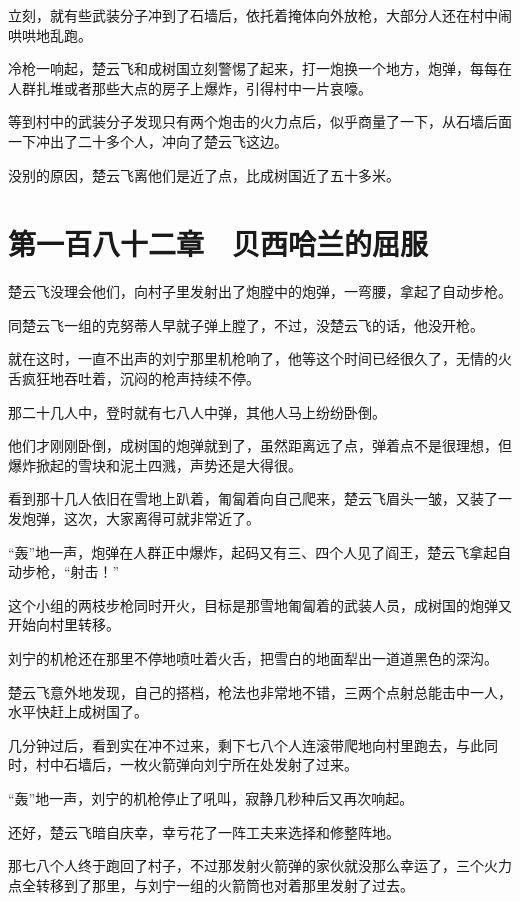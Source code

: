 立刻，就有些武装分子冲到了石墙后，依托着掩体向外放枪，大部分人还在村中闹哄哄地乱跑。

冷枪一响起，楚云飞和成树国立刻警惕了起来，打一炮换一个地方，炮弹，每每在人群扎堆或者那些大点的房子上爆炸，引得村中一片哀嚎。

等到村中的武装分子发现只有两个炮击的火力点后，似乎商量了一下，从石墙后面一下冲出了二十多个人，冲向了楚云飞这边。

没别的原因，楚云飞离他们是近了点，比成树国近了五十多米。

\section{第一百八十二章　贝西哈兰的屈服}

楚云飞没理会他们，向村子里发射出了炮膛中的炮弹，一弯腰，拿起了自动步枪。

同楚云飞一组的克努蒂人早就子弹上膛了，不过，没楚云飞的话，他没开枪。

就在这时，一直不出声的刘宁那里机枪响了，他等这个时间已经很久了，无情的火舌疯狂地吞吐着，沉闷的枪声持续不停。

那二十几人中，登时就有七八人中弹，其他人马上纷纷卧倒。

他们才刚刚卧倒，成树国的炮弹就到了，虽然距离远了点，弹着点不是很理想，但爆炸掀起的雪块和泥土四溅，声势还是大得很。

看到那十几人依旧在雪地上趴着，匍匐着向自己爬来，楚云飞眉头一皱，又装了一发炮弹，这次，大家离得可就非常近了。

“轰”地一声，炮弹在人群正中爆炸，起码又有三、四个人见了阎王，楚云飞拿起自动步枪，“射击！”

这个小组的两枝步枪同时开火，目标是那雪地匍匐着的武装人员，成树国的炮弹又开始向村里转移。

刘宁的机枪还在那里不停地喷吐着火舌，把雪白的地面犁出一道道黑色的深沟。

楚云飞意外地发现，自己的搭档，枪法也非常地不错，三两个点射总能击中一人，水平快赶上成树国了。

几分钟过后，看到实在冲不过来，剩下七八个人连滚带爬地向村里跑去，与此同时，村中石墙后，一枚火箭弹向刘宁所在处发射了过来。

“轰”地一声，刘宁的机枪停止了吼叫，寂静几秒种后又再次响起。

还好，楚云飞暗自庆幸，幸亏花了一阵工夫来选择和修整阵地。

那七八个人终于跑回了村子，不过那发射火箭弹的家伙就没那么幸运了，三个火力点全转移到了那里，与刘宁一组的火箭筒也对着那里发射了过去。

